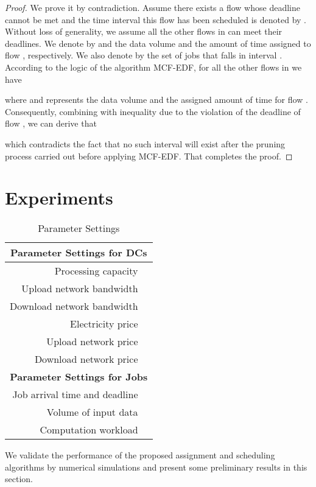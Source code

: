 \documentclass{article}
\begin{document}
\begin{proof}
We prove it by contradiction. Assume there exists a flow  whose deadline cannot be met and the time interval this flow has been scheduled is denoted by . Without loss of generality, we assume all the other flows in  can meet their deadlines. We denote by  and  the data volume and the amount of time assigned to flow , respectively. We also denote by  the set of jobs that falls in interval . According to the logic of the algorithm MCF-EDF, for all the other flows in  we have 

where  and  represents the data volume and the assigned amount of time for flow . Consequently, combining with inequality  due to the violation of the deadline of flow , we can derive that

which contradicts the fact that no such interval will exist after the pruning process carried out before applying MCF-EDF. That completes the proof.
\end{proof}



\section{Experiments}
\label{sec:exp}

\begin{table}
\caption{\label{tb:para}Parameter Settings}
\centering
\begin{tabular}{ r|l }
  \hline
  \multicolumn{2}{c}{\textbf{Parameter Settings for DCs}} \\
  \hline
  Processing capacity  &  \\
  Upload network bandwidth  &  \\
  Download network bandwidth  &  \\
  Electricity price  &  \\
  Upload network price  &  \\
  Download network price  &  \\
  \hline
  \hline
  \multicolumn{2}{c}{\textbf{Parameter Settings for Jobs}} \\
  \hline
  Job arrival time and deadline  &  \\
  Volume of input data  &  \\
  Computation workload  &  \\
  \hline
\end{tabular}
\end{table}

We validate the performance of the proposed assignment and scheduling algorithms by numerical simulations and present some preliminary results in this section.
\end{document}
